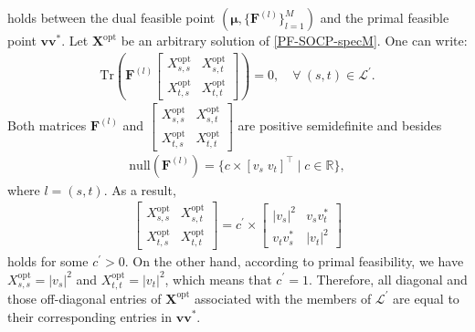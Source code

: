 \documentclass[journal,twoside]{IEEEtran}
\newcommand{\Tr}{\mathrm{Tr}}
\newcommand{\bmu}{\bm{\mu}}
\newcommand{\cL}{{\mathcal L}}
\begin{document}
 holds between the dual feasible point
$(\bmu,\{\mathbf{F}^{(l)}\}^{M}_{l=1})$
and the primal feasible point $\mathbf{v}\mathbf{v}^{\ast}$.
Let $\mathbf{X}^{\mathrm{opt}}$ be an arbitrary solution of \eqref{PF-SOCP-specM}. One can write:
\begin{align}
\Tr\left(\mathbf{F}^{(l)}
\begin{bmatrix}
X^{\mathrm{opt}}_{s,s} & X^{\mathrm{opt}}_{s,t}\\
X^{\mathrm{opt}}_{t,s} & X^{\mathrm{opt}}_{t,t}
\end{bmatrix}
\right)= 0,
\quad\forall~(s,t) \in \cL^{\prime}.
\end{align}
Both matrices $\mathbf{F}^{(l)}$ and
$\begin{bmatrix}
	X^{\mathrm{opt}}_{s,s} & X^{\mathrm{opt}}_{s,t}\\
	X^{\mathrm{opt}}_{t,s} & X^{\mathrm{opt}}_{t,t}
\end{bmatrix}$
are positive semidefinite and besides
\begin{align}
\mathrm{null}(\mathbf{F}^{(l)})=\{c\times[v_s \; v_t]^{\top} \;|\; c\in\mathbb{R}\},
\end{align}
where $l=(s,t)$. As a result,
\begin{align}
\begin{bmatrix}
X^{\mathrm{opt}}_{s,s} & X^{\mathrm{opt}}_{s,t}\\
X^{\mathrm{opt}}_{t,s} & X^{\mathrm{opt}}_{t,t}
\end{bmatrix}=c^{\prime}\times
\begin{bmatrix}
|v_s|^2 & v_s v^{\ast}_t\\
v_t v^{\ast}_s & |v_t|^2
\end{bmatrix}
\end{align}
holds for some $c^{\prime}>0$. On the other hand, according to primal feasibility, we have $X^{\mathrm{opt}}_{s,s}=|v_s|^2$ and $X^{\mathrm{opt}}_{t,t}=|v_t|^2$, which means that $c^{\prime}=1$. Therefore, all diagonal and those off-diagonal entries of $\mathbf{X}^{\mathrm{opt}}$ associated with the members of $\mathcal{L}^{\prime}$ are equal to their corresponding entries in $\mathbf{v}\mathbf{v}^{\ast}$.
\end{document}
